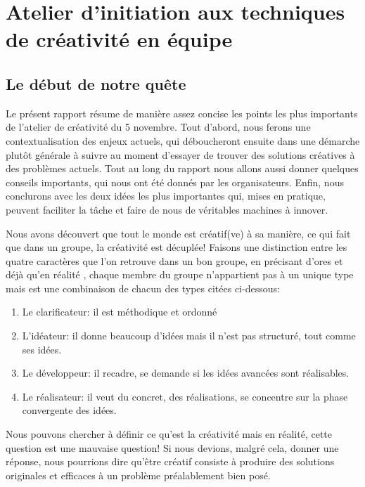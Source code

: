 \section{Atelier d'initiation aux techniques de créativité en équipe}


\subsection{Le début de notre quête}

Le présent rapport résume de manière assez concise les points les plus importants de l'atelier de créativité du 5 novembre. Tout d'abord, nous ferons une contextualisation des enjeux actuels, qui déboucheront ensuite dans une démarche plutôt générale à suivre au moment d'essayer de trouver des solutions créatives à des problèmes actuels. Tout au long du rapport nous allons aussi donner quelques conseils importants, qui nous ont été donnés par les organisateurs. Enfin, nous conclurons avec les deux idées les plus importantes qui, mises en pratique, peuvent faciliter la tâche et faire de nous de véritables machines à innover.

Nous avons découvert que tout le monde est créatif(ve) à sa manière, ce qui fait que dans un groupe, la créativité est décuplée! Faisons une distinction entre les quatre caractères que l'on retrouve dans un bon groupe, en précisant d'ores et déjà qu'en réalité , chaque membre du groupe n’appartient pas à un unique type mais est une combinaison de chacun des types citées ci-dessous:

\begin{enumerate}
\item Le clarificateur: il est méthodique et ordonné
\item L'idéateur: il donne beaucoup d’idées mais il n'est pas structuré, tout comme ses idées.
\item  Le développeur: il recadre, se demande si les idées avancées sont réalisables.
\item Le réalisateur: il veut du concret, des réalisations, se concentre sur la phase convergente des idées.
\end{enumerate}

Nous pouvons chercher à définir ce qu’est la créativité mais en réalité, cette question est une mauvaise question! Si nous devions, malgré cela, donner une réponse, nous pourrions dire qu’être créatif consiste à produire des solutions originales et efficaces à un problème préalablement bien posé. 

